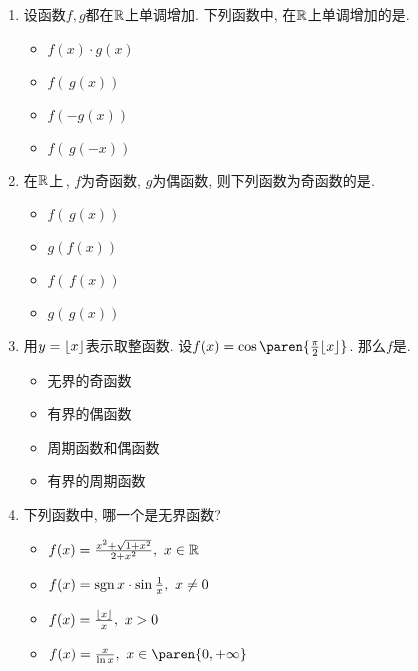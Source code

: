 \documentclass[a4paper,punct=CCT]{ctexbook}
\theoremstyle{break}
\newif\ifshowsol
\begin{document}
\begin{enumerate}
\item 设函数\(f, g\)都在\(\mathbb{R}\)上单调增加.  下列函数中, 在\(\mathbb{R}\)上单调增加的是\uline{\makebox[3em]{}}.
  \begin{itemize}
    \renewcommand{\labelitemi}{\faCircleThin}
  \item \(f(x) \cdot g(x)\)
    \ifshowsol
  \item[\faCircle] \(f(\,g(x))\)
    \else
  \item \(f(\,g(x))\)
    \fi
  \item \(f(-g(x))\)
  \item \(f(\,g(-x))\)
  \end{itemize}

\item 在\(\mathbb{R}\)上\,, \(f\)为奇函数, \(g\)为偶函数, 则下列函数为奇函数的是\uline{\makebox[3em]{}}.
  \begin{itemize}
    \renewcommand{\labelitemi}{\faCircleThin}
  \item \(f(\,g(x))\)
  \item \(g(f(x))\)
    \ifshowsol
  \item[\faCircle] \(f(\,f(x))\)
    \else
  \item \(f(\,f(x))\)
    \fi
  \item \(g(\,g(x))\)
  \end{itemize}

\item 用\(y = \lfloor x\rfloor\)表示取整函数.  设\(f(x) = \cos\paren{\frac\pi2 \floor x}\).  那么\(f\)是\uline{\makebox[4em]{}}.
  \begin{itemize}
    \renewcommand{\labelitemi}{\faCircleThin}
  \item 无界的奇函数
  \item 有界的偶函数
  \item 周期函数和偶函数
    \ifshowsol
  \item[\faCircle] 有界的周期函数
    \else
  \item 有界的周期函数
    \fi
  \end{itemize}

\item 下列函数中, 哪一个是无界函数?
  \begin{itemize}
    \renewcommand{\labelitemi}{\faCircleThin}
  \item \(f(x) = \frac{x^2 + \sqrt{1+x^2}}{2 + x^2},\ x \in \mathbb{R}\)
  \item \(f(x) = \operatorname{sgn} x \cdot \sin \frac1x,\ x \ne 0\)
  \item \(f(x) = \frac{\lfloor x\rfloor}{x},\ x > 0\)
    \ifshowsol
  \item[\faCircle] \(f(x) = \frac{x}{\ln x},\ x \in \paren{0,+\infty}\)
    \else
  \item \(f(x) = \frac{x}{\ln x},\ x \in \paren{0,+\infty}\)
    \fi
  \end{itemize}


\end{enumerate}
\end{document}
